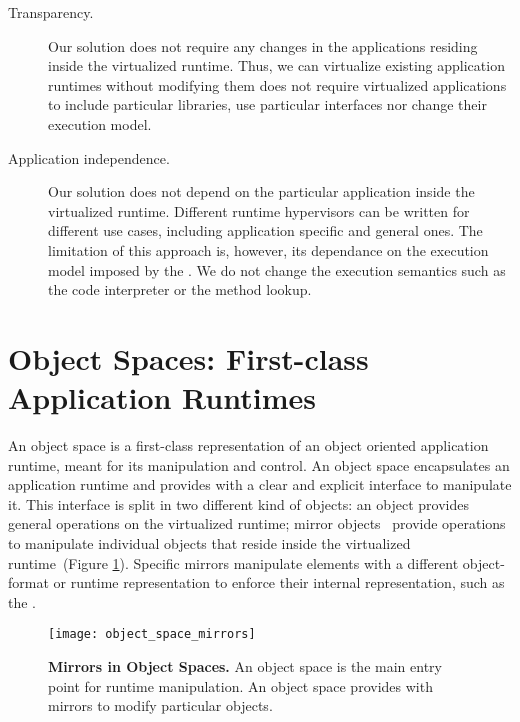 \begin{description}
\item[Transparency.] Our solution does not require any changes in the applications residing inside the virtualized runtime. Thus, we can virtualize existing application runtimes without modifying them \ie \Vtt does not require virtualized applications to include particular libraries, use particular interfaces nor change their execution model.

\item[Application independence.] Our solution does not depend on the particular application inside the virtualized runtime. Different runtime hypervisors can be written for different use cases, including application specific and general ones. The limitation of this approach is, however, its dependance on the execution model imposed by the \VM. We do not change the \VM execution semantics such as the code interpreter or the method lookup.
\end{description}

\section{Object Spaces: First-class Application Runtimes} \label{sec:object_space}

An object space is a first-class representation of an object oriented application runtime, meant for its manipulation and control. An object space encapsulates an application runtime and provides with a clear and explicit interface to manipulate it. This interface is split in two different kind of objects: an  object provides general operations on the virtualized runtime; mirror objects~\cite{Brac04b} provide operations to manipulate individual objects that reside inside the virtualized runtime~(Figure \ref{fig:objectSpaceMirrors}). Specific mirrors manipulate elements with a different object-format or runtime representation to enforce their internal representation, such as the .

\begin{figure}[ht]
\begin{center}
\texttt{[image: object\_space\_mirrors]}
\caption{\textbf{Mirrors in Object Spaces.} An object space is the main entry point for runtime manipulation. An object space provides with mirrors to modify particular objects. \label{fig:objectSpaceMirrors}}
\end{center}
\end{figure}


